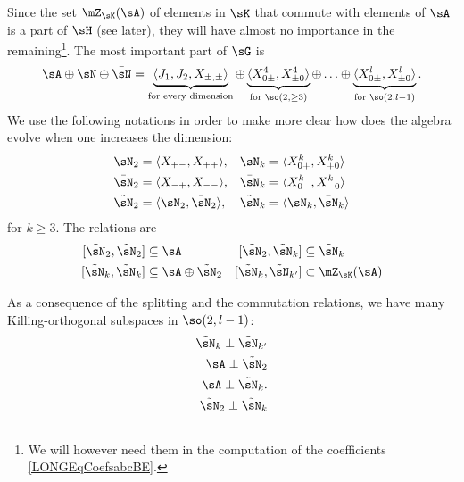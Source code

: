 Since the set $\mZ_{\sK}(\sA)$ of elements in $\sK$ that commute with elements of $\sA$ is a part of $\sH$ (see later), they will have almost no importance in the remaining\footnote{We will however need them in the computation of the coefficients \eqref{LONGEqCoefsabcBE}.}. The most important part of $\sG$ is
\begin{equation}		\label{LONGEqDecomDimQlipm}
	\sA\oplus\sN\oplus\bar\sN=\underbrace{\langle J_1,J_2,X_{\pm,\pm}\rangle}_{\text{for every dimension}}\oplus\underbrace{\langle X_{0\pm}^{4},X_{\pm 0}^{4}\rangle}_{\text{for }\so(2,\geq 3)}\oplus\ldots\oplus\underbrace{\langle X_{0\pm}^l,X_{\pm 0}^{l}\rangle}_{\text{for } \so(2, l-1)}.
\end{equation}
We use the following notations in order to make more clear how does the algebra evolve when one increases the dimension:
\begin{equation}
	\begin{aligned}[]
		\sN_2       & =\langle X_{+-},X_{++}\rangle,   & \sN_k       & =\langle X^k_{0+},X_{+0}^k\rangle \\
		\bar\sN_2   & =\langle X_{-+},X_{--} \rangle,  & \bar\sN_k   & =\langle X_{0-}^k,X_{-0}^k\rangle \\
		\tilde\sN_2 & =\langle \sN_2,\bar\sN_2\rangle, & \tilde\sN_k & =\langle \sN_k,\bar\sN_k\rangle
	\end{aligned}
\end{equation}
for $k\geq 3$. The relations are
\begin{equation}		\label{LONGEqsCommWithtsNDeuxkA}
	\begin{aligned}[]
		[\tilde\sN_2,\tilde\sN_2]   & \subseteq\sA
		                            & [\tilde\sN_2,\tilde\sN_k]     & \subseteq\tilde\sN_k   \\
		[\tilde\sN_k,\tilde\sN_{k}] & \subseteq\sA\oplus\tilde\sN_2
		                            & [\tilde\sN_k,\tilde\sN_{k'}]  & \subset \mZ_{\sK}(\sA) \\
	\end{aligned}
\end{equation}

As a consequence of the splitting and the commutation relations, we have many Killing-orthogonal subspaces in $\so(2,l-1)$:
\begin{subequations}
	\begin{align}
		\tilde\sN_k\perp\tilde\sN_{k'}		\label{LONGEqtsnkperprtsnkp} \\
		\sA\perp\tilde\sN_2			\label{LONGEqAperpNTrois}               \\
		\sA\perp\tilde\sN_k.	\label{LONGEqAperpNk}                  \\
		\tilde\sN_2\perp\tilde\sN_k	\label{LONGEqNTtroisperpNk}
	\end{align}
\end{subequations}

